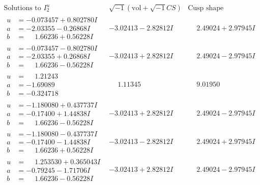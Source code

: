 \documentclass[1p]{elsarticle_modified}
\theoremstyle{definition}
\newcommand{\I}{\sqrt{-1}}
\begin{document}
$$\begin{array}{c|c|c}  
\text{Solutions to }I^u_{2}& \I (\text{vol} + \sqrt{-1}CS) & \text{Cusp shape}\\
 \hline 
\begin{aligned}
u &= -0.073457 + 0.802780 I \\
a &= -2.03355 - 0.26868 I \\
b &= \phantom{-}1.66236 + 0.56228 I\end{aligned}
 & -3.02413 - 2.82812 I & \phantom{-}2.49024 + 2.97945 I \\ \hline\begin{aligned}
u &= -0.073457 - 0.802780 I \\
a &= -2.03355 + 0.26868 I \\
b &= \phantom{-}1.66236 - 0.56228 I\end{aligned}
 & -3.02413 + 2.82812 I & \phantom{-}2.49024 - 2.97945 I \\ \hline\begin{aligned}
u &= \phantom{-}1.21243\phantom{ +0.000000I} \\
a &= -1.69089\phantom{ +0.000000I} \\
b &= -0.324718\phantom{ +0.000000I}\end{aligned}
 & \phantom{-}1.11345\phantom{ +0.000000I} & \phantom{-}9.01950\phantom{ +0.000000I} \\ \hline\begin{aligned}
u &= -1.180080 + 0.437737 I \\
a &= -0.17400 + 1.44838 I \\
b &= \phantom{-}1.66236 - 0.56228 I\end{aligned}
 & -3.02413 + 2.82812 I & \phantom{-}2.49024 - 2.97945 I \\ \hline\begin{aligned}
u &= -1.180080 - 0.437737 I \\
a &= -0.17400 - 1.44838 I \\
b &= \phantom{-}1.66236 + 0.56228 I\end{aligned}
 & -3.02413 - 2.82812 I & \phantom{-}2.49024 + 2.97945 I \\ \hline\begin{aligned}
u &= \phantom{-}1.253530 + 0.365043 I \\
a &= -0.79245 - 1.71706 I \\
b &= \phantom{-}1.66236 - 0.56228 I\end{aligned}
 & -3.02413 + 2.82812 I & \phantom{-}2.49024 - 2.97945 I \\ \hline\begin{aligned}

\end{aligned}
\end{array}$$
\end{document}
